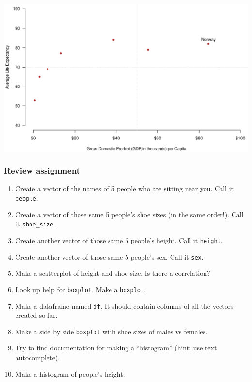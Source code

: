 \documentclass[
]{book}
\begin{document}
\includegraphics{figures/unnamed-chunk-122-1.pdf}

\hypertarget{review-assignment-6}{%
\subsubsection*{Review assignment}\label{review-assignment-6}}

\begin{enumerate}
\def\labelenumi{\arabic{enumi}.}
\item
  Create a vector of the names of 5 people who are sitting near you. Call it \texttt{people}.
\item
  Create a vector of those same 5 people's shoe sizes (in the same order!). Call it \texttt{shoe\_size}.
\item
  Create another vector of those same 5 people's height. Call it \texttt{height}.
\item
  Create another vector of those same 5 people's sex. Call it \texttt{sex}.
\item
  Make a scatterplot of height and shoe size. Is there a correlation?
\item
  Look up help for \texttt{boxplot}. Make a \texttt{boxplot}.
\item
  Make a dataframe named \texttt{df}. It should contain columns of all the vectors created so far.
\item
  Make a side by side \texttt{boxplot} with shoe sizes of males vs females.
\item
  Try to find documentation for making a ``histogram'' (hint: use text autocomplete).
\item
  Make a histogram of people's height.
\end{enumerate}
\end{document}
